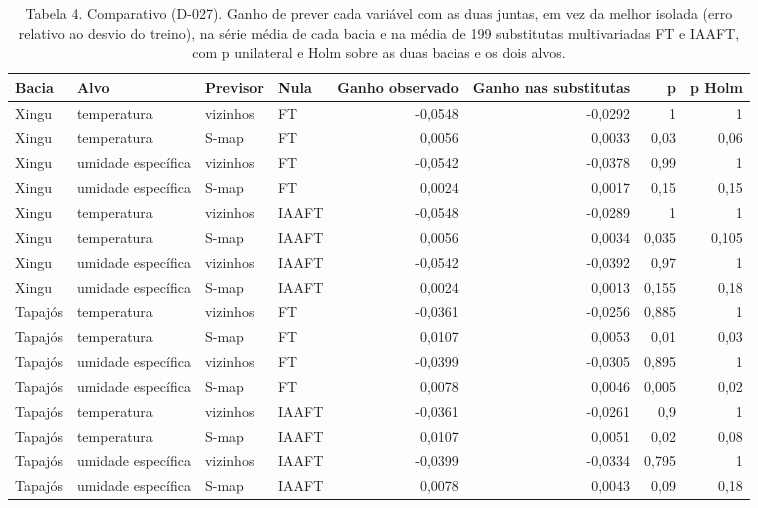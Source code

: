 \begin{table}
\caption{Tabela 4. Comparativo (D-027). Ganho de prever cada variável com as duas juntas, em vez da melhor isolada (erro relativo ao desvio do treino), na série média de cada bacia e na média de 199 substitutas multivariadas FT e IAAFT, com p unilateral e Holm sobre as duas bacias e os dois alvos.}
\label{tab:06_surrogates::multivariado_bacia}
\begin{tabular}{llllrrrr}
\toprule
Bacia & Alvo & Previsor & Nula & Ganho observado & Ganho nas substitutas & p & p Holm \\
\midrule
Xingu & temperatura & vizinhos & FT & -0,0548 & -0,0292 & 1 & 1 \\
Xingu & temperatura & S-map & FT & 0,0056 & 0,0033 & 0,03 & 0,06 \\
Xingu & umidade específica & vizinhos & FT & -0,0542 & -0,0378 & 0,99 & 1 \\
Xingu & umidade específica & S-map & FT & 0,0024 & 0,0017 & 0,15 & 0,15 \\
Xingu & temperatura & vizinhos & IAAFT & -0,0548 & -0,0289 & 1 & 1 \\
Xingu & temperatura & S-map & IAAFT & 0,0056 & 0,0034 & 0,035 & 0,105 \\
Xingu & umidade específica & vizinhos & IAAFT & -0,0542 & -0,0392 & 0,97 & 1 \\
Xingu & umidade específica & S-map & IAAFT & 0,0024 & 0,0013 & 0,155 & 0,18 \\
Tapajós & temperatura & vizinhos & FT & -0,0361 & -0,0256 & 0,885 & 1 \\
Tapajós & temperatura & S-map & FT & 0,0107 & 0,0053 & 0,01 & 0,03 \\
Tapajós & umidade específica & vizinhos & FT & -0,0399 & -0,0305 & 0,895 & 1 \\
Tapajós & umidade específica & S-map & FT & 0,0078 & 0,0046 & 0,005 & 0,02 \\
Tapajós & temperatura & vizinhos & IAAFT & -0,0361 & -0,0261 & 0,9 & 1 \\
Tapajós & temperatura & S-map & IAAFT & 0,0107 & 0,0051 & 0,02 & 0,08 \\
Tapajós & umidade específica & vizinhos & IAAFT & -0,0399 & -0,0334 & 0,795 & 1 \\
Tapajós & umidade específica & S-map & IAAFT & 0,0078 & 0,0043 & 0,09 & 0,18 \\
\bottomrule
\end{tabular}
\end{table}
